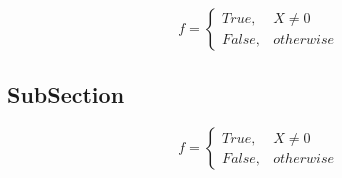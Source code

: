 \documentclass[a4paper]{article}
\begin{document}
\begin{equation}   f =
\begin{cases} True, & X \neq 0\\
False, & otherwise
\end{cases}
\end{equation}

\subsection{SubSection}

\begin{equation}   f =
\begin{cases} True, & X \neq 0\\
False, & otherwise
\end{cases}
\end{equation}
\end{document}
